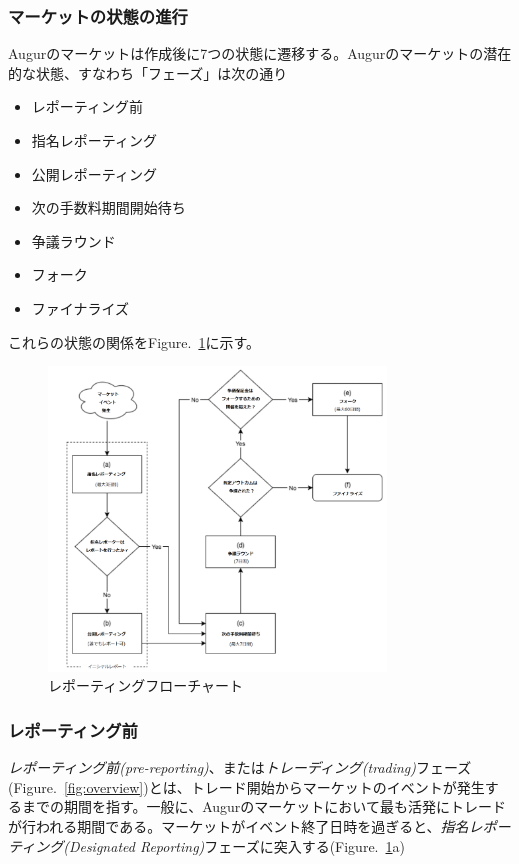 \documentclass[floatfix,reprint,nofootinbib,amsmath,amssymb,epsfig,pre,floats,letterpaper,groupedaffiliation]{revtex4-1}
\theoremstyle{definition}
\theoremstyle{definition}
\theoremstyle{definition}
\begin{document}
\subsubsection{マーケットの状態の進行}

Augurのマーケットは作成後に7つの状態に遷移する。Augurのマーケットの潜在的な状態、すなわち「フェーズ」は次の通り
\begin{itemize}
\item レポーティング前
\item 指名レポーティング
\item 公開レポーティング
\item 次の手数料期間開始待ち
\item 争議ラウンド
\item フォーク
\item ファイナライズ
\end{itemize}

これらの状態の関係をFigure.~\ref{fig:reporting}に示す。

\begin{figure}
\includegraphics[bb=0 0 621 596, width=0.8\textwidth]{new_reporting.pdf}
\caption{レポーティングフローチャート}
\label{fig:reporting}
\end{figure}

\subsubsection{レポーティング前}

\textit{レポーティング前(pre-reporting)}、または\textit{トレーディング(trading)}フェーズ(Figure.~\ref{fig:overview})とは、トレード開始からマーケットのイベントが発生するまでの期間を指す。一般に、Augurのマーケットにおいて最も活発にトレードが行われる期間である。マーケットがイベント終了日時を過ぎると、\textit{指名レポーティング(Designated Reporting)}フェーズに突入する(Figure.~\ref{fig:reporting}a)
\end{document}
